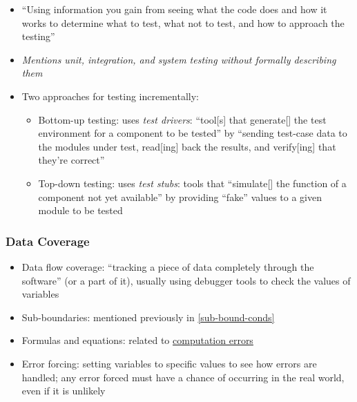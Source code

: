 \begin{itemize}
      \item ``Using information you gain from seeing what the code does and how
            it works to determine what to test, what not to test, and how to
            approach the testing'' \cite[p.~105]{patton_software_2006}
      \item \emph{Mentions unit, integration, and system testing without
                  formally describing them} \cite[p.~109]{patton_software_2006}
      \item Two approaches for testing incrementally:
            \begin{itemize}
                  \item Bottom-up testing: uses \emph{test drivers}: ``tool[s]
                        that generate[] the test environment for a component to
                        be tested'' \cite[p.~410]{van_vliet_software_2000} by
                        ``sending test-case data to the modules under test,
                        read[ing] back the results, and verify[ing] that
                        they're correct'' \cite[p.~109]{patton_software_2006}
                  \item Top-down testing: uses \emph{test stubs}: tools that
                        ``simulate[] the function of a component not yet
                        available'' \cite[p.~410]{van_vliet_software_2000} by
                        providing ``fake'' values to a given module to be
                        tested \cite[p.~110]{patton_software_2006}
            \end{itemize}
\end{itemize}

\subsubsection{Data Coverage \cite[p.~114-116]{patton_software_2006}}

\begin{itemize}
      \item Data flow coverage: ``tracking a piece of data completely through
            the software'' (or a part of it), usually using debugger tools to
            check the values of variables \cite[p.~114]{patton_software_2006}
      \item Sub-boundaries: mentioned previously in \ref{sub-bound-conds}
      \item Formulas and equations: related to
            \hyperref[comp-errors]{computation errors}
      \item Error forcing: setting variables to specific values to see how
            errors are handled; any error forced must have a chance of
            occurring in the real world, even if it is unlikely
            \cite[p.~116]{patton_software_2006}
\end{itemize}

